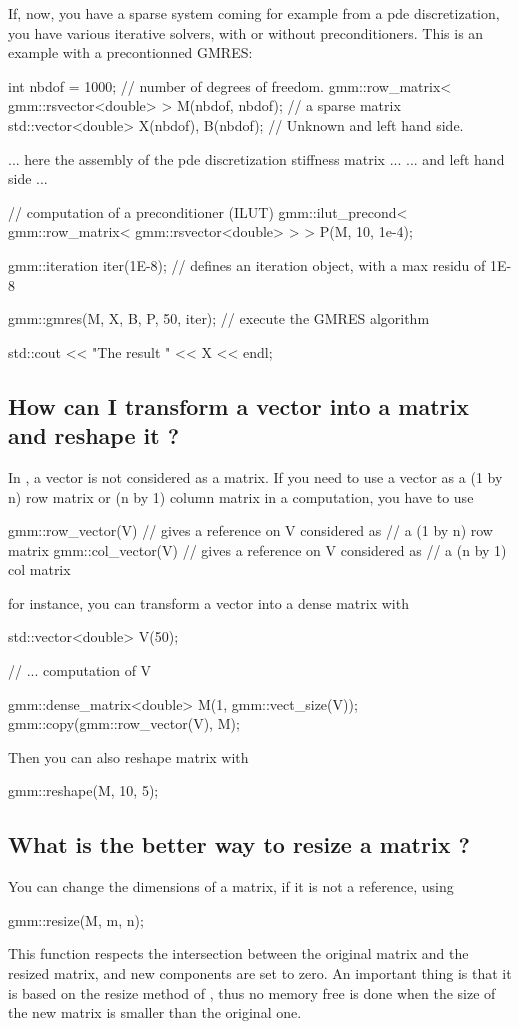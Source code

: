 \documentclass[11pt,a4paper]{article}
\begin{document}
If, now, you have a sparse system coming for example from a pde discretization, you have various iterative solvers, with or without preconditioners. This is an example with a precontionned GMRES:
 \begin{cppcode}
  int nbdof = 1000; // number of degrees of freedom.
  gmm::row_matrix< gmm::rsvector<double> > M(nbdof, nbdof); // a sparse matrix
  std::vector<double> X(nbdof), B(nbdof); // Unknown and left hand side.

  ... here the assembly of the pde discretization stiffness matrix ...
  ... and left hand side ...


  // computation of a preconditioner (ILUT)
  gmm::ilut_precond< gmm::row_matrix< gmm::rsvector<double> > > P(M, 10, 1e-4);

  gmm::iteration iter(1E-8);  // defines an iteration object, with a max residu of 1E-8

  gmm::gmres(M, X, B, P, 50, iter);  // execute the GMRES algorithm

  std::cout << "The result " << X << endl;
\end{cppcode}

\subsection{How can I transform a vector into a matrix and reshape it ?}
In \gmm, a vector is not considered as a matrix. If you need to use a vector as a (1 by n) row matrix or (n by 1) column matrix in a computation, you have to use
\begin{cppcode}
   gmm::row_vector(V) // gives a reference on V considered as
                      // a (1 by n) row matrix
   gmm::col_vector(V) // gives a reference on V considered as
                      // a (n by 1) col matrix
\end{cppcode}
for instance, you can transform a vector into a dense matrix with
\begin{cppcode}
  std::vector<double> V(50);

  // ... computation of V

  gmm::dense_matrix<double> M(1, gmm::vect_size(V));
  gmm::copy(gmm::row_vector(V), M);
\end{cppcode}

Then you can also reshape matrix  with
\begin{cppcode}
  gmm::reshape(M, 10, 5);
\end{cppcode}

\subsection{What is the better way to resize a matrix ?}
You can change the dimensions of a matrix, if it is not a reference, using
\begin{cppcode}
  gmm::resize(M, m, n);
\end{cppcode}
This function respects the intersection between the original matrix and the resized matrix, and new components are set to zero. An important thing is that it is based on the resize method of , thus no memory free is done when the size of the new matrix is smaller than the original one.\\[0.5cm]
\end{document}
